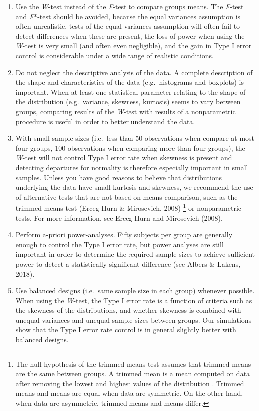 \documentclass[man,floatsintext]{apa6}
\providecommand{\tightlist}{%
  \setlength{\itemsep}{0pt}\setlength{\parskip}{0pt}}
\let\rmarkdownfootnote\footnote%
\def\footnote{\protect\rmarkdownfootnote}
\begin{document}
\begin{enumerate}
\def\labelenumi{\arabic{enumi}.}
\tightlist
\item
  Use the \emph{W}-test instead of the \emph{F}-test to compare groups means. The \emph{F}-test and \emph{F}*-test should be avoided, because the equal variances assumption is often unrealistic, tests of the equal variances assumption will often fail to detect differences when these are present, the loss of power when using the \emph{W}-test is very small (and often even negligible), and the gain in Type I error control is considerable under a wide range of realistic conditions.
\item
  Do not neglect the descriptive analysis of the data. A complete description of the shape and characteristics of the data (e.g.~histograms and boxplots) is important. When at least one statistical parameter relating to the shape of the distribution (e.g.~variance, skewness, kurtosis) seems to vary between groups, comparing results of the \emph{W}-test with results of a nonparametric procedure is useful in order to better understand the data.\\
\item
  With small sample sizes (i.e.~less than 50 observations when compare at most four groups, 100 observations when comparing more than four groups), the \emph{W}-test will not control Type I error rate when skewness is present and detecting departures for normality is therefore especially important in small samples. Unless you have good reasons to believe that distributions underlying the data have small kurtosis and skewness, we recommend the use of alternative tests that are not based on means comparison, such as the trimmed means test (Erceg-Hurn \& Mirosevich, 2008) \footnote{The null hypothesis of the trimmed means test assumes that trimmed means are the same between groups. A trimmed mean is a mean computed on data after removing the lowest and highest values of the distribution . Trimmed means and means are equal when data are symmetric. On the other hand, when data are asymmetric, trimmed means and means differ.} or nonparametric tests. For more information, see Erceg-Hurn and Mirosevich (2008).
\item
  Perform a-priori power-analyses. Fifty subjects per group are generally enough to control the Type I error rate, but power analyses are still important in order to determine the required sample sizes to achieve sufficient power to detect a statistically significant difference (see Albers \& Lakens, 2018).
\item
  Use balanced designs (i.e.~same sample size in each group) whenever possible. When using the \emph{W}-test, the Type I error rate is a function of criteria such as the skewness of the distributions, and whether skewness is combined with unequal variances and unequal sample sizes between groups. Our simulations show that the Type I error rate control is in general slightly better with balanced designs.
\end{enumerate}
\end{document}
